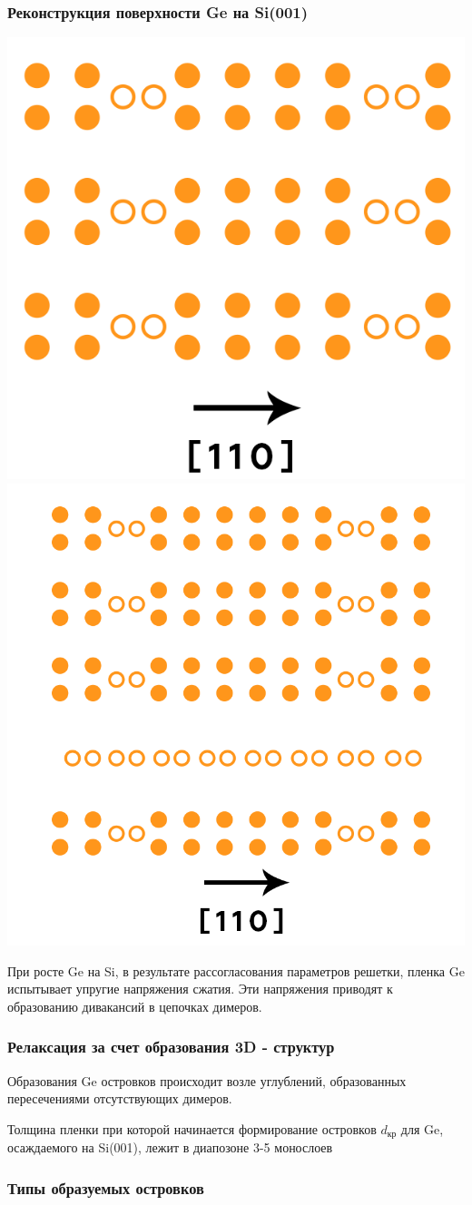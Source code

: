 \documentclass[10pt,pdf,hyperref={unicode}, dvipsnames]{beamer}
\begin{document}
\begin{frame}[t]
	\frametitle{Реконструкция поверхности Ge на Si(001)}
	\includegraphics[width = .49\linewidth]{imgs/Dim2.png}
	\includegraphics[width = .49\linewidth]{imgs/DimM.png}


	При росте Ge на Si, в результате рассогласования параметров решетки, пленка Ge испытывает упругие напряжения сжатия.
	Эти напряжения приводят к образованию дивакансий в цепочках димеров.	
\end{frame}

\begin{frame}[t]
	\frametitle{Релаксация за счет образования 3D - структур}
	Образования Ge островков происходит возле углублений, образованных пересечениями отсутствующих димеров.

	Толщина пленки при которой начинается формирование островков $d_{\text{кр}}$ для Ge, осаждаемого на Si(001), лежит в
	диапозоне 3-5 монослоев


\end{frame}

\begin{frame}[t]
	\frametitle{Типы образуемых островков}

\end{frame}
\end{document}
